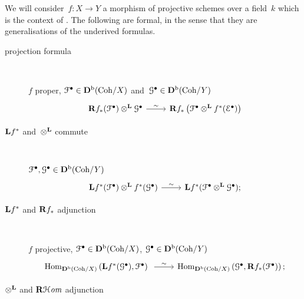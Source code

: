 We will consider~$f\colon X\to Y$ a morphism of projective schemes over a field~$k$ which is the context of \cite{huybrechts-fourier-mukai-transforms}. The following are formal, in the sense that they are generalisations of the underived formulas.
\begin{description}
  \item[projection formula] {\ }
    
    $f$ proper, $\mathcal{F}^\bullet\in\mathbf{D}^{\mathrm{b}}(\mathrm{Coh}/X)$ and~$\mathcal{G}^\bullet\in\mathbf{D}^{\mathrm{b}}(\mathrm{Coh}/Y)$
    \begin{equation}
      \begin{tikzcd}
        \RRR f_*(\mathcal{F}^\bullet)\otimes^\LLL\mathcal{G}^\bullet \arrow{r}{\sim} & \RRR f_*\left( \mathcal{F}^\bullet\otimes^\LLL f^*(\mathcal{E}^\bullet) \right)
      \end{tikzcd}
    \end{equation}

  \item[$\mathbf{L} f^*$ and~$\otimes^{\mathbf{L}}$ commute] {\ }
    
    $\mathcal{F}^\bullet,\mathcal{G}^\bullet\in\mathbf{D}^{\mathrm{b}}(\mathrm{Coh}/Y)$
    \begin{equation}
      \begin{tikzcd}
        \LLL f^*(\mathcal{F}^\bullet)\otimes^\LLL f^*(\mathcal{G}^\bullet) \arrow{r}{\sim} & \LLL f^*(\mathcal{F}^\bullet\otimes^\LLL\mathcal{G}^\bullet);
      \end{tikzcd}
    \end{equation}

  \item[$\mathbf{L} f^*$ and $\mathbf{R} f_*$ adjunction] {\ }
    
    $f$ projective, $\mathcal{F}^\bullet\in\mathbf{D}^{\mathrm{b}}(\mathrm{Coh}/X)$, $\mathcal{G}^\bullet\in\mathbf{D}^{\mathrm{b}}(\mathrm{Coh}/Y)$
    \begin{equation}
      \begin{tikzcd}
        \Hom_{\derived^\bounded(\Coh/X)}\left( \LLL f^*(\mathcal{G}^\bullet),\mathcal{F}^\bullet \right) \arrow{r}{\sim} & \Hom_{\derived^\bounded(\Coh/X)}\left( \mathcal{G}^\bullet,\RRR f_*(\mathcal{F}^\bullet) \right);
      \end{tikzcd}
    \end{equation}

  \item[$\otimes^{\mathbf{L}}$ and $\operatorname{\mathbf{R}\mathcal{H}\mathit{om}}$ adjunction] {\ }
    

\end{description}
